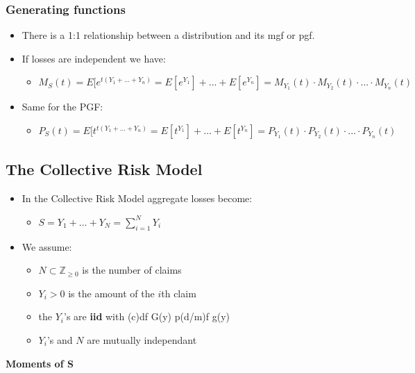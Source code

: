 \documentclass{article}
\begin{document}
\subsubsection{Generating functions}
\begin{itemize}
    \item There is a 1:1 relationship between a distribution and its mgf or pgf.
    \item If losses are independent we have:
    \begin{itemize}
        \item $M_S(t) = E[e^{t(Y_1 + ...+ Y_n)} = E[e^{Y_1}] + ... + E[e^{Y_n}] = M_{Y_1}(t) \cdot M_{Y_2}(t) \cdot ... \cdot M_{Y_n}(t)$
    \end{itemize}
    \item Same for the PGF:
    \begin{itemize}
        \item $P_S(t) = E[t^{t(Y_1 + ...+ Y_n)} = E[t^{Y_1}] + ... + E[t^{Y_n}] = P_{Y_1}(t) \cdot P_{Y_2}(t) \cdot ... \cdot P_{Y_n}(t)$
    \end{itemize}
\end{itemize}

\subsection{The Collective Risk Model}
\begin{itemize}
    \item In the Collective Risk Model aggregate losses become:
    \begin{itemize}
        \item $S = Y_1 + ... + Y_N = \sum_{i=1}^N Y_i$
    \end{itemize}
    \item We assume:
    \begin{itemize}
        \item $N \subset \mathbb{Z}_{\geq 0}$ is the number of claims
        \item $Y_i > 0$ is the amount of the $i$th claim
        \item the $Y_i$'s are \textbf{iid} with
        \subitem (c)df G(y)
        \subitem p(d/m)f g(y)
        \item $Y_i$'s and $N$ are mutually independant
    \end{itemize}
\end{itemize}






\noindent\textbf{Moments of S}
\end{document}
